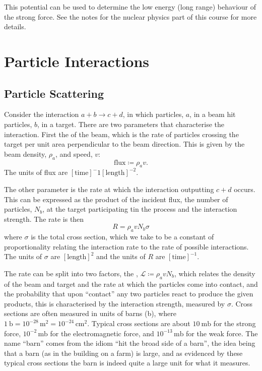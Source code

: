 \documentclass[fleqn]{NotesClass}
\newcommand*{\luminosity}{\mathcal{L}}
\begin{document}
    This potential can be used to determine the low energy (long range) behaviour of the strong force.
    See the notes for the nuclear physics part of this course for more details.
    
    \section{Particle Interactions}
    \subsection{Particle Scattering}\label{sec:particle scattering}
    Consider the interaction \(a + b \to c + d\), in which particles, \(a\), in a beam hit particles, \(b\), in a target.
    There are two parameters that characterise the interaction.
    First the  of the beam, which is the rate of particles crossing the target per unit area perpendicular to the beam direction.
    This is given by the beam density, \(\rho_a\), and speed, \(v\):
    \begin{equation}
        \mathrm{flux} \coloneqq \rho_a v.
    \end{equation}
    The units of flux are \([\mathrm{time}]^-1[\mathrm{length}]^{-2}\).
    
    The other parameter is the rate at which the interaction outputting \(c + d\) occurs.
    This can be expressed as the product of the incident flux, the number of particles, \(N_b\), at the target participating tin the process and the interaction strength.
    The rate is then
    \begin{equation}
        R = \rho_a v N_b \sigma
    \end{equation}
    where \(\sigma\) is the total cross section, which we take to be a constant of proportionality relating the interaction rate to the rate of possible interactions.
    The units of \(\sigma\) are \([\mathrm{length}]^2\) and the units of \(R\) are \([\mathrm{time}]^{-1}\).
    
    The rate can be split into two factors, the , \(\luminosity \coloneqq \rho_avN_b\), which relates the density of the beam and target and the rate at which the particles come into contact, and the probability that upon \enquote{contact} any two particles react to produce the given products, this is characterised by the interaction strength, measured by \(\sigma\).
    Cross sections are often measured in units of barns (\unit{\barn}), where \(\qty{1}{\barn} = 10^{-28}\,\unit{\metre\squared} = 10^{-24}\,\unit{\centi\metre\squared}\).
    Typical cross sections are about \(\qty{10}{\milli\barn}\) for the strong force, \(10^{-2}\,\unit{\milli\barn}\) for the electromagnetic force, and \(10^{-13}\,\unit{\milli\barn}\) for the weak force.
    The name \enquote{barn} comes from the idiom \enquote{hit the broad side of a barn}, the idea being that a barn (as in the building on a farm) is large, and as evidenced by these typical cross sections the barn is indeed quite a large unit for what it measures.
    
\end{document}
